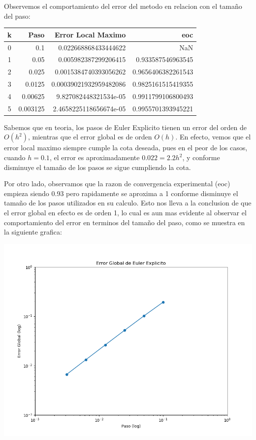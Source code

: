 \documentclass[11pt]{article}
\makeatletter
\def\maxwidth{\ifdim\Gin@nat@width>\linewidth\linewidth
    \else\Gin@nat@width\fi}
\let\Oldincludegraphics\includegraphics
\renewcommand{\includegraphics}[1]{\Oldincludegraphics[width=.8\maxwidth]{#1}}
\makeatother
\begin{document}
    Observemos el comportamiento del error del metodo en relacion con el
tamaño del paso:
\begin{center}
\begin{tabular}{|c|r r r|} 
 \hline 
k & Paso & Error Local Maximo & eoc \\ \hline 
0 & 0.1 & 0.022668868433444622 & NaN \\
1 & 0.05 & 0.005982387299206415 & 0.933587546963545 \\
2 & 0.025 & 0.0015384740393056262 & 0.9656406382261543 \\ 
3 & 0.0125 & 0.00039021932959482086 & 0.9825161515419355 \\ 
4 & 0.00625 & 9.827082448321534e-05 & 0.9911799106800493 \\ 
5 & 0.003125 & 2.4658225118656674e-05 & 0.9955701393945221 \\ 
\hline 
 \end{tabular}
 \end{center}

    Sabemos que en teoria, los pasos de Euler Explicito tienen un error del
orden de \(O(h^2)\), mientras que el error global es de orden \(O(h)\).
En efecto, vemos que el error local maximo siempre cumple la cota
deseada, pues en el peor de los casos, cuando \(h=0.1\), el error es
aproximadamente \(0.022 = 2.2h^2\), y conforme disminuye el tamaño de
los pasos se sigue cumpliendo la cota.

Por otro lado, observamos que la razon de convergencia experimental
(eoc) empieza siendo 0.93 pero rapidamente se aproxima a 1 conforme
disminuye el tamaño de los pasos utilizados en su calculo. Esto nos
lleva a la conclusion de que el error global en efecto es de orden 1, lo
cual es aun mas evidente al observar el comportamiento del error en
terminos del tamaño del paso, como se muestra en la siguiente grafica:


    \begin{center}
    \includegraphics{fig 1.2.png}
    \end{center}
    
\end{document}
